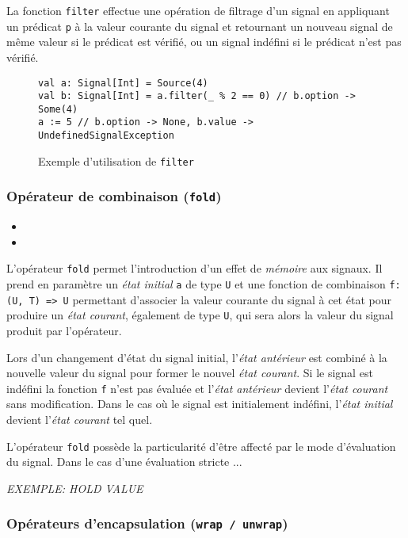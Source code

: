 La fonction \texttt{filter} effectue une opération de filtrage d'un signal en appliquant un prédicat \texttt{p} à la valeur courante du signal et retournant un nouveau signal de même valeur si le prédicat est vérifié, ou un signal indéfini si le prédicat n'est pas vérifié.

\begin{figure}[h]
	\begin{lstlisting}
val a: Signal[Int] = Source(4)
val b: Signal[Int] = a.filter(_ % 2 == 0) // b.option -> Some(4)
a := 5 // b.option -> None, b.value -> UndefinedSignalException
	\end{lstlisting}
	\caption{Exemple d'utilisation de \texttt{filter}}
\end{figure}

\subsubsection{Opérateur de combinaison (\texttt{fold})}

\begin{itemize}
	\item {}
	\item {}
\end{itemize}

L'opérateur \texttt{fold} permet l'introduction d'un effet de \emph{mémoire} aux signaux. Il prend en paramètre un \emph{état initial} \texttt{a} de type \texttt{U} et une fonction de combinaison \texttt{f: (U, T) => U} permettant d'associer la valeur courante du signal à cet état pour produire un \emph{état courant}, également de type \texttt{U}, qui sera alors la valeur du signal produit par l'opérateur.

Lors d'un changement d'état du signal initial, l'\emph{état antérieur} est combiné à la nouvelle valeur du signal pour former le nouvel \emph{état courant}. Si le signal est indéfini la fonction \texttt{f} n'est pas évaluée et l'\emph{état antérieur} devient l'\emph{état courant} sans modification. Dans le cas où le signal est initialement indéfini, l'\emph{état initial} devient l'\emph{état courant} tel quel.

L'opérateur \texttt{fold} possède la particularité d'être affecté par le mode d'évaluation du signal. Dans le cas d'une évaluation stricte ...

\textit{EXEMPLE: HOLD VALUE}

\subsubsection{Opérateurs d'encapsulation (\texttt{wrap / unwrap})}

